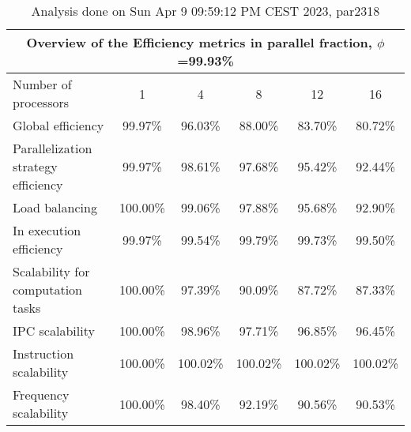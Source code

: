 \begin{table}[h]
\begin{center}
\begin{tabular}{|l|c|c|c|c|c|}
\hline
\multicolumn{6}{|c|}{Overview of the Efficiency metrics in parallel fraction, $\phi$=99.93\%} \\
\hline
\hline
Number of processors & 1 & 4 & 8 & 12 & 16 \\
\hline
\hline
Global efficiency                      &     99.97\% &     96.03\% &     88.00\% &     83.70\% &     80.72\% \\
\hline
\hline
Parallelization strategy efficiency &     99.97\% &     98.61\% &     97.68\% &     95.42\% &     92.44\% \\
\hline
Load balancing                   &    100.00\% &     99.06\% &     97.88\% &     95.68\% &     92.90\% \\
In execution efficiency          &     99.97\% &     99.54\% &     99.79\% &     99.73\% &     99.50\% \\
\hline
\hline
Scalability for computation tasks   &    100.00\% &     97.39\% &     90.09\% &     87.72\% &     87.33\% \\
\hline
IPC scalability                  &    100.00\% &     98.96\% &     97.71\% &     96.85\% &     96.45\% \\
Instruction scalability          &    100.00\% &    100.02\% &    100.02\% &    100.02\% &    100.02\% \\
Frequency scalability            &    100.00\% &     98.40\% &     92.19\% &     90.56\% &     90.53\% \\
\hline
\end{tabular}
\end{center}
\caption{ Analysis done on Sun Apr  9 09:59:12 PM CEST 2023, par2318}
\end{table}
